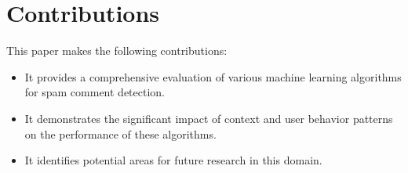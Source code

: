 \documentclass{article}
\begin{document}
\section{Contributions}
This paper makes the following contributions:
\begin{itemize}
    \item It provides a comprehensive evaluation of various machine learning algorithms for spam comment detection.
    \item It demonstrates the significant impact of context and user behavior patterns on the performance of these algorithms.
    \item It identifies potential areas for future research in this domain.
\end{itemize}



\end{document}
